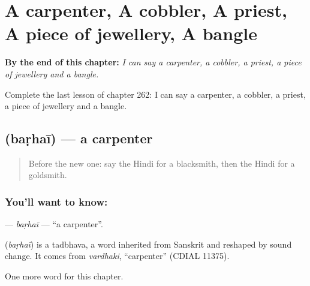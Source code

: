 
\chapter{A carpenter, A cobbler, A priest, A piece of jewellery, A bangle}
\label{ch:hi-a-carpenter-a-cobbler-a-priest-a-piece-of-jewellery-a-bangle}

\begin{chapteropening}
\textbf{By the end of this chapter:} \emph{I can say a carpenter, a cobbler, a priest, a piece of jewellery and a bangle.}

Complete the last lesson of chapter 262: I can say a carpenter, a cobbler, a priest, a piece of jewellery and a bangle.
\end{chapteropening}

\section[\texorpdfstring{\hi{बढ़ई} (baṛhaī)}{बढ़ई (baṛhaī)}]{ (baṛhaī) — a carpenter}

\label{lesson:HI-C262-barhai}



\begin{quote}
Before the new one: say the Hindi for a blacksmith, then the Hindi for a goldsmith.
\end{quote}

\subsection*{You'll want to know: }
\textbf{} — \emph{baṛhaī} — \textquotedblleft{}a carpenter\textquotedblright{}.

\begin{cousinweb}
\textbf{} (\emph{baṛhaī}) is a tadbhava, a word inherited from Sanskrit and reshaped by sound change. It comes from \emph{vardhaki}, \textquotedblleft{}carpenter\textquotedblright{} (CDIAL 11375).
\end{cousinweb}

\begin{grammarlens}[title={What you've built}]
One more word for this chapter.
\end{grammarlens}

